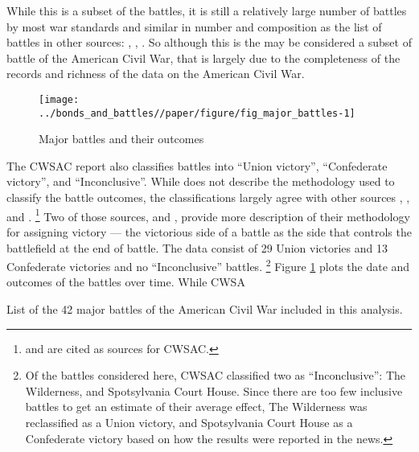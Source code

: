 While this is a subset of the battles, it is still a relatively large number of battles by most war standards and similar in number and composition as the list of battles in other sources: \textcite{Livermore1900}, \textcite{Bodart1908}, \textcite{cdb90}.
So although this is the may be considered a subset of battle of the American Civil War, that is largely due to the completeness of the records and richness of the data on the American Civil War.

\begin{figure}[htpb]
  \centering
  \texttt{[image: ../bonds\_and\_battles//paper/figure/fig\_major\_battles-1]}
  \caption{Major battles and their outcomes}
  \label{bonds_battles:fig:major_battles}
\end{figure}

The CWSAC report \parencite{CWSAC1993b} also classifies battles into ``Union victory'', ``Confederate victory'', and ``Inconclusive''.
While \textcite{CWSAC1993} does not describe the methodology used to classify the battle outcomes, the classifications largely agree with other sources \textcite{fox1898regimental}, \textcite{Livermore1900}, \textcite{Bodart1908} and \textcite{cdb90}.%
\footnote{\textcite{fox1898regimental} and \textcite{Livermore1900} are cited as sources for CWSAC.}
Two of those sources, \textcite{fox1898regimental} and \textcite{Livermore1900}, provide more description of their methodology for assigning victory --- the victorious side of a battle as the side that controls the battlefield at the end of battle.
The data consist of 29 Union victories and 13 Confederate victories and no ``Inconclusive'' battles.%
\footnote{
  Of the battles considered here, CWSAC classified two as ``Inconclusive'': The Wilderness, and Spotsylvania Court House.
  Since there are too few inclusive battles to get an estimate of their average effect, The Wilderness was reclassified as a Union victory, and Spotsylvania Court House as a Confederate victory based on how the results were reported in the news.
}
Figure \ref{bonds_battles:fig:major_battles} plots the date and outcomes of the  battles over time.
While CWSA

\begin{table}
  \centering
  
  \caption{List of the 42 major battles of the American Civil War included in this analysis.}
  \label{bonds_battles:tab:battles}
\end{table}

